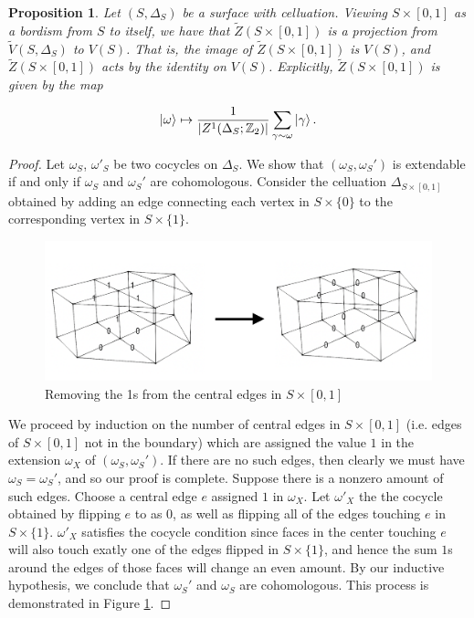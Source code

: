 \documentclass{article}
\newtheorem{proposition}{Proposition}[section]
\theoremstyle{definition}
\numberwithin{figure}{section}
\begin{document}
\begin{proposition}\label{Z formula} Let $(S,\Delta_S)$ be a surface with celluation. Viewing $S\times [0,1]$ as a bordism from $S$ to itself, we have that $\tilde{Z}(S\times [0,1])$ is a projection from $\tilde{V}(S,\Delta_S)$ to $V(S)$. That is, the image of $\tilde{Z}(S\times [0,1])$ is $V(S)$, and $\tilde{Z}(S\times [0,1])$ acts by the identity on $V(S)$. Explicitly, $\tilde{Z}(S\times [0,1])$ is given by the map

$$\left| \omega\right>\mapsto \frac{1}{|Z^1(\Delta_{S};\mathbb{Z}_2)|}\sum_{\gamma \sim \omega}\left|\gamma\right>.$$

\end{proposition}
\begin{proof} Let $\omega_{S}$, $\omega'_{S}$ be two cocycles on $\Delta_{S}$. We show that $(\omega_{S},\omega_{S}')$ is extendable if and only if $\omega_{S}$ and $\omega_{S}'$ are cohomologous. Consider the celluation $\Delta_{S\times [0,1]}$ obtained by adding an edge connecting each vertex in $S\times\{0\}$ to the corresponding vertex in $S\times \{1\}$.

\begin{figure}
\begin{center}
\includegraphics[scale=0.3]{cohomologous}
\caption{Removing the 1s from the central edges in $S\times [0,1]$}
\label{fig:cohomologous}
\end{center}
\end{figure}

We proceed by induction on the number of central edges in $S\times [0,1]$ (i.e. edges of $S\times [0,1]$ not in the boundary) which are assigned the value $1$ in the extension $\omega_X$ of $(\omega_{S},\omega_{S}')$. If there are no such edges, then clearly we must have $\omega_{S}=\omega_{S}'$, and so our proof is complete. Suppose there is a nonzero amount of such edges. Choose a central edge $e$ assigned $1$ in $\omega_X$. Let $\omega'_X$ the the cocycle obtained by flipping $e$ to as $0$, as well as flipping all of the edges touching $e$ in $S\times\{1\}$. $\omega'_X$ satisfies the cocycle condition since faces in the center touching $e$ will also touch exatly one of the edges flipped in $S\times \{1\}$, and hence the sum $1$s around the edges of those faces will change an even amount. By our inductive hypothesis, we conclude that $\omega_{S}'$ and $\omega_{S}$ are cohomologous. This process is demonstrated in Figure \ref{fig:cohomologous}.


\end{proof}
\end{document}
